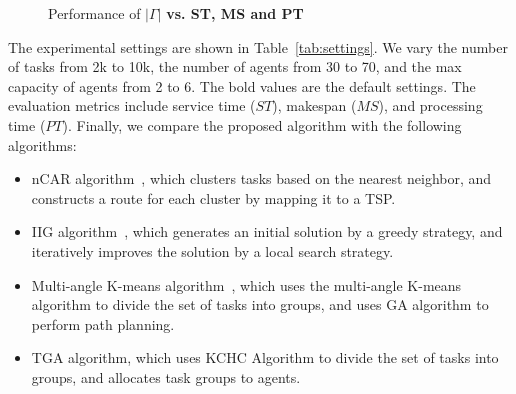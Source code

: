 \documentclass[sigconf,anonymous]{aamas}
\begin{document}
\begin{figure}[htbp]

  \caption{Performance of $|\Gamma|$ \textbf{vs. ST, MS and PT}}
  \label{fig:ep:task}
\end{figure}

The experimental settings are shown in Table~\ref{tab:settings}.
We vary the number of tasks from 2k to 10k,
the number of agents from 30 to 70,
and the max capacity of agents from 2 to 6.
The bold values are the default settings.
The evaluation metrics include service time ($ST$), makespan ($MS$), and processing time ($PT$).
Finally, we compare the proposed algorithm with the following algorithms:
\begin{itemize}
  \item nCAR algorithm~\cite{sarkar2018scalable},
  which clusters tasks based on the nearest neighbor,
  and constructs a route for each cluster by mapping it to a TSP.
  \item IIG algorithm~\cite{zhang2022effective},
  which generates an initial solution by a greedy strategy,
  and iteratively improves the solution by a local search strategy.
  \item Multi-angle K-means algorithm~\cite{electronics12183842},
  which uses the multi-angle K-means algorithm to divide the set of tasks into groups,
  and uses GA algorithm to perform path planning.
  \item TGA algorithm, which uses KCHC Algorithm to divide the set of tasks into groups,
  and allocates task groups to agents.
\end{itemize}
\end{document}
